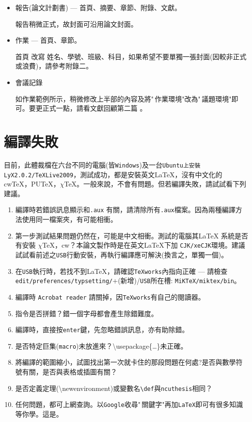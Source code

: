 \begin{itemize}
\item 報告(論文計劃書) --- 首頁、摘要、章節、附錄、文獻。

報告稍微正式，故封面可沿用論文封面。

\item 作業 --- 首頁、章節。

首頁 改寫 姓名、學號、班級、科目，如果希望不要單獨一張封面(因較非正式或浪費)，請參考附錄二。


\item 會議記錄

如作業範例所示，稍微修改上半部的內容及將"\,作業環境"改為"\,議題環境"即可。要更正式一點，請看文獻回顧第二篇
。
\end{itemize}

\section{編譯失敗}
目前，此體裁檔在六台不同的電腦(皆{\tt Windows})及一台{\tt Ubuntu上安裝LyX2.0.2/TeXLive2009}，測試成功，都是安裝英文\LaTeX{}，沒有中文化的cw\TeX，PU\TeX，$\chi$\TeX。一般來說，不會有問題。但若編譯失敗，請試試看下列建議。
\begin{enumerate}
\item 編譯時若錯誤訊息顯示和{\tt .aux} 有關，請清除所有{\tt *.aux}檔案。因為兩種編譯方法使用同一檔案夾，有可能相衝。 
\item 第一步測試結果問題仍然在，可能是中文相衝。測試的電腦其\LaTeX{ }系統是否有安裝 $\chi$\TeX，cw？本論文製作時是在英文\LaTeX{}下加 {\tt CJK/xeCJK}環境。建議試試看前述之{\tt USB}行動安裝，再執行編譯應可解決(換言之，單獨一個)。
\item {\color{red} 在{\tt USB}執行時，若找不到\LaTeX，請確認{\tt TeXworks}內指向正確 --- 
請檢查{\tt edit/preferences/typsetting/}+(新增)/{\tt USB}所在槽: \hfil\break
{\tt MiKTeX/miktex/bin}}。
\item {\color{red}編譯時 {\tt Acrobat reader} 請關掉，因{\tt TeXworks}有自己的閱讀器。}
\item 指令是否拼錯？錯一個字母都會產生除錯難度。
\item 編譯時，直接按{\tt enter}鍵，先忽略錯誤訊息，亦有助除錯。
\item 是否特定巨集({\tt macro})未放進來？\textbackslash usepackage\{\ldots\}未正確。
\item 將編譯的範圍縮小，試圖找出第一次就卡住的那段問題在何處?是否與數學符號有關，是否與表格或插圖有關？
\item 是否定義定理(\textbackslash newenvironment)或變數名{\verb|\def|}與{\tt ncuthesis}相同？
\item 任何問題，都可上網查詢。以{\tt Google}收尋"\,關鍵字"再加{\tt LaTeX}即可有很多知識等你學。這是。
\end{enumerate}
